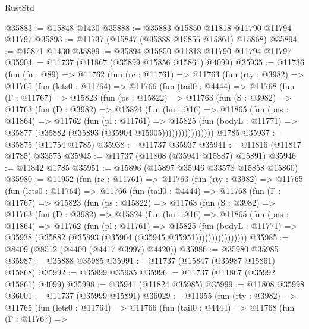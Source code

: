 \begin{lexlean}{RustStd}
\begin{coremodule}
@35883 := @15848 @1430
@35888 := @35883 @15850 @11818 @11790 @11794 @11797
@35893 := @11737 (@15847 (@35888 @15856 @15861) @15868)
@35894 := @15871 @1430
@35899 := @35894 @15850 @11818 @11790 @11794 @11797
@35904 := @11737 (@11867 (@35899 @15856 @15861) @4099)
@35935 := @11736
    (fun (fn : @89) =>
    @11762
      (fun (rc : @11761) =>
      @11763
        (fun (rty : @3982) =>
        @11765
          (fun (lets0 : @11764) =>
          @11766
            (fun (tail0 : @4444) =>
            @11768
              (fun (Γ : @11767) =>
              @15823
                (fun (ps : @15822) =>
                @11763
                  (fun (S : @3982) =>
                  @11763
                    (fun (D : @3982) =>
                    @15824
                      (fun (hn : @16) =>
                      @11865
                        (fun (pns : @11864) =>
                        @11762
                          (fun (pl : @11761) =>
                          @15825
                            (fun (bodyL : @11771) =>
                            @35877 (@35882 (@35893 (@35904 @15905))))))))))))))))
    @1785
@35937 := @35875 (@11754 @1785)
@35938 := @11737 @35937
@35941 := @11816 (@11817 @1785) @33575
@35945 := @11737 (@11808 (@35941 @15887) @15891)
@35946 := @11842 @1785
@35951 := @15896 (@15897 @35946 @33578 @15858 @15860)
@35980 := @11952
    (fun (rc : @11761) =>
    @11763
      (fun (rty : @3982) =>
      @11765
        (fun (lets0 : @11764) =>
        @11766
          (fun (tail0 : @4444) =>
          @11768
            (fun (Γ : @11767) =>
            @15823
              (fun (ps : @15822) =>
              @11763
                (fun (S : @3982) =>
                @11763
                  (fun (D : @3982) =>
                  @15824
                    (fun (hn : @16) =>
                    @11865
                      (fun (pns : @11864) =>
                      @11762
                        (fun (pl : @11761) =>
                        @15825
                          (fun (bodyL : @11771) =>
                          @35938 (@35882 (@35893 (@35904 (@35945 @35951))))))))))))))))
@35985 := @8409 (@8512 (@4400 (@4417 @3997) @4420))
@35986 := @35980 @35985
@35987 := @35888 @35985
@35991 := @11737 (@15847 (@35987 @15861) @15868)
@35992 := @35899 @35985
@35996 := @11737 (@11867 (@35992 @15861) @4099)
@35998 := @35941 (@11824 @35985)
@35999 := @11808 @35998
@36001 := @11737 (@35999 @15891)
@36029 := @11955
    (fun (rty : @3982) =>
    @11765
      (fun (lets0 : @11764) =>
      @11766
        (fun (tail0 : @4444) =>
        @11768
          (fun (Γ : @11767) =>

\end{coremodule}
\end{lexlean}
